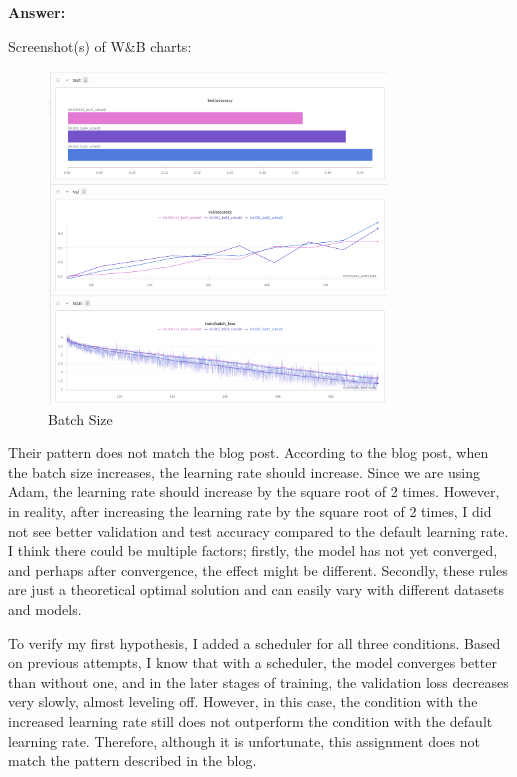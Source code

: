 \documentclass[11pt, oneside]{article}   	%
\begin{document}
\begin{answerbox} \textbf{Answer:} \vspace*{1cm}


Screenshot(s) of W\&B charts:

\begin{figure}[h]
    \centering
    \includegraphics[width=0.8\textwidth]{images/batch_size.png}
    \caption{Batch Size}
\end{figure}

Their pattern does not match the blog post. According to the blog post, when the batch size increases, the learning rate should increase. Since we are using Adam, the learning rate should increase by the square root of 2 times. However, in reality, after increasing the learning rate by the square root of 2 times, I did not see better validation and test accuracy compared to the default learning rate. I think there could be multiple factors; firstly, the model has not yet converged, and perhaps after convergence, the effect might be different. Secondly, these rules are just a theoretical optimal solution and can easily vary with different datasets and models.

To verify my first hypothesis, I added a scheduler for all three conditions. Based on previous attempts, I know that with a scheduler, the model converges better than without one, and in the later stages of training, the validation loss decreases very slowly, almost leveling off. However, in this case, the condition with the increased learning rate still does not outperform the condition with the default learning rate. Therefore, although it is unfortunate, this assignment does not match the pattern described in the blog.


\end{answerbox}
\end{document}
